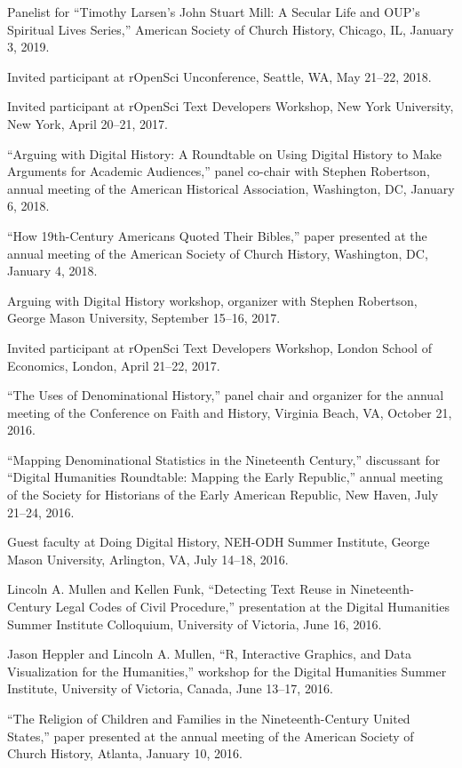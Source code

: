 \documentclass[11pt]{article}
\begin{document}
Panelist for ``Timothy Larsen's John Stuart Mill: A Secular Life and OUP's Spiritual Lives Series,'' American Society of Church History, Chicago, IL, January 3, 2019.

Invited participant at rOpenSci Unconference, Seattle, WA, May 21--22, 2018.

Invited participant at rOpenSci Text Developers Workshop, New York University, 
New York, April 20--21, 2017.

``Arguing with Digital History: A Roundtable on Using Digital History to Make 
Arguments for Academic Audiences,'' panel co-chair with Stephen Robertson, 
annual meeting of the American Historical Association, Washington, DC, January 
6, 2018.

``How 19th-Century Americans Quoted Their Bibles,'' paper presented at the 
annual meeting of the American Society of Church History, Washington, DC, 
January 4, 2018.

Arguing with Digital History workshop, organizer with Stephen Robertson, 
George Mason University, September 15--16, 2017.

Invited participant at rOpenSci Text Developers Workshop, London School of Economics, London, April 21--22, 2017.

``The Uses of Denominational History,'' panel chair and organizer for the annual meeting of the Conference on Faith and History, Virginia Beach, VA, October 21, 2016.

``Mapping Denominational Statistics in the Nineteenth Century,'' discussant 
for ``Digital Humanities Roundtable: Mapping the Early Republic,'' annual 
meeting of the Society for Historians of the Early American Republic, New 
Haven, July 21--24, 2016.

Guest faculty at Doing Digital History, NEH-ODH Summer Institute, George 
Mason University, Arlington, VA, July 14--18, 2016.

Lincoln A. Mullen and Kellen Funk, ``Detecting Text Reuse in Nineteenth-Century 
Legal Codes of Civil Procedure,'' presentation at the Digital Humanities 
Summer Institute Colloquium, University of Victoria, June 16, 2016.

Jason Heppler and Lincoln A. Mullen, ``R, Interactive Graphics, and Data 
Visualization for the Humanities,'' workshop for the Digital Humanities Summer 
Institute, University of Victoria, Canada, June 13--17, 2016.  

``The Religion of Children and Families in the Nineteenth-Century United 
States,'' paper presented at the annual meeting of the American Society of 
Church History, Atlanta, January 10, 2016.
\end{document}
